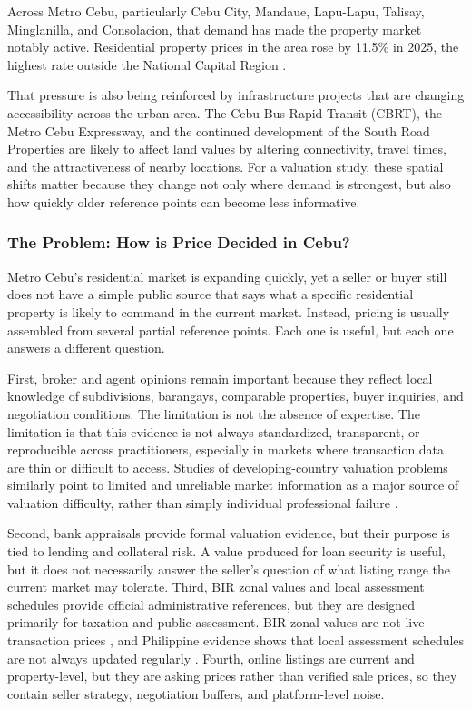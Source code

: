 Across Metro Cebu, particularly Cebu City, Mandaue, Lapu-Lapu, Talisay, Minglanilla, and Consolacion, that demand has made the property market notably active. Residential property prices in the area rose by 11.5\% in 2025, the highest rate outside the National Capital Region \parencite{bsp2025}.

That pressure is also being reinforced by infrastructure projects that are changing accessibility across the urban area. The Cebu Bus Rapid Transit (CBRT), the Metro Cebu Expressway, and the continued development of the South Road Properties are likely to affect land values by altering connectivity, travel times, and the attractiveness of nearby locations. For a valuation study, these spatial shifts matter because they change not only where demand is strongest, but also how quickly older reference points can become less informative.

\subsubsection{The Problem: How is Price Decided in Cebu?}\label{the-problem-how-is-price-decided-in-cebu}

Metro Cebu's residential market is expanding quickly, yet a seller or buyer still does not have a simple public source that says what a specific residential property is likely to command in the current market. Instead, pricing is usually assembled from several partial reference points. Each one is useful, but each one answers a different question.

First, broker and agent opinions remain important because they reflect local knowledge of subdivisions, barangays, comparable properties, buyer inquiries, and negotiation conditions. The limitation is not the absence of expertise. The limitation is that this evidence is not always standardized, transparent, or reproducible across practitioners, especially in markets where transaction data are thin or difficult to access. Studies of developing-country valuation problems similarly point to limited and unreliable market information as a major source of valuation difficulty, rather than simply individual professional failure \parencite{cheloti2021,ajibola2010}.

Second, bank appraisals provide formal valuation evidence, but their purpose is tied to lending and collateral risk. A value produced for loan security is useful, but it does not necessarily answer the seller's question of what listing range the current market may tolerate. Third, BIR zonal values and local assessment schedules provide official administrative references, but they are designed primarily for taxation and public assessment. BIR zonal values are not live transaction prices \parencite{bir_nd}, and Philippine evidence shows that local assessment schedules are not always updated regularly \parencite{otsuka2023}. Fourth, online listings are current and property-level, but they are asking prices rather than verified sale prices, so they contain seller strategy, negotiation buffers, and platform-level noise.

